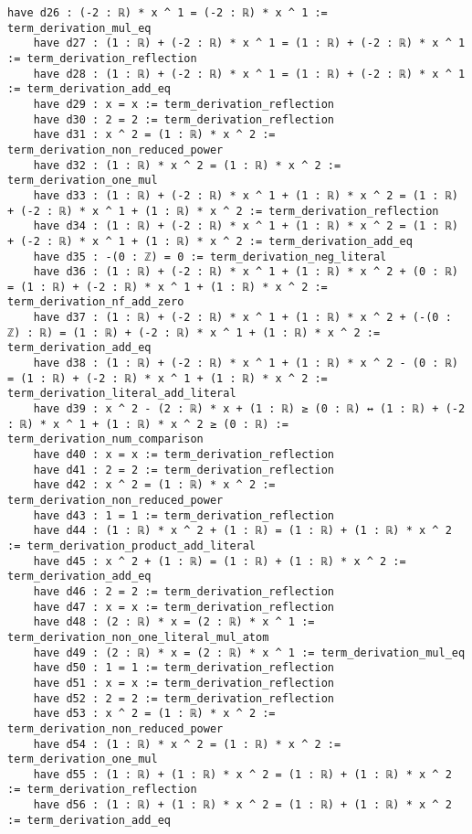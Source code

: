 \documentclass{article}
\begin{document}
\begin{tcolorbox}[colback=white!10, width=\linewidth]
\begin{lstlisting}[language=Lean4]
    have d26 : (-2 : ℝ) * x ^ 1 = (-2 : ℝ) * x ^ 1 := term_derivation_mul_eq
    have d27 : (1 : ℝ) + (-2 : ℝ) * x ^ 1 = (1 : ℝ) + (-2 : ℝ) * x ^ 1 := term_derivation_reflection
    have d28 : (1 : ℝ) + (-2 : ℝ) * x ^ 1 = (1 : ℝ) + (-2 : ℝ) * x ^ 1 := term_derivation_add_eq
    have d29 : x = x := term_derivation_reflection
    have d30 : 2 = 2 := term_derivation_reflection
    have d31 : x ^ 2 = (1 : ℝ) * x ^ 2 := term_derivation_non_reduced_power
    have d32 : (1 : ℝ) * x ^ 2 = (1 : ℝ) * x ^ 2 := term_derivation_one_mul
    have d33 : (1 : ℝ) + (-2 : ℝ) * x ^ 1 + (1 : ℝ) * x ^ 2 = (1 : ℝ) + (-2 : ℝ) * x ^ 1 + (1 : ℝ) * x ^ 2 := term_derivation_reflection
    have d34 : (1 : ℝ) + (-2 : ℝ) * x ^ 1 + (1 : ℝ) * x ^ 2 = (1 : ℝ) + (-2 : ℝ) * x ^ 1 + (1 : ℝ) * x ^ 2 := term_derivation_add_eq
    have d35 : -(0 : ℤ) = 0 := term_derivation_neg_literal
    have d36 : (1 : ℝ) + (-2 : ℝ) * x ^ 1 + (1 : ℝ) * x ^ 2 + (0 : ℝ) = (1 : ℝ) + (-2 : ℝ) * x ^ 1 + (1 : ℝ) * x ^ 2 := term_derivation_nf_add_zero
    have d37 : (1 : ℝ) + (-2 : ℝ) * x ^ 1 + (1 : ℝ) * x ^ 2 + (-(0 : ℤ) : ℝ) = (1 : ℝ) + (-2 : ℝ) * x ^ 1 + (1 : ℝ) * x ^ 2 := term_derivation_add_eq
    have d38 : (1 : ℝ) + (-2 : ℝ) * x ^ 1 + (1 : ℝ) * x ^ 2 - (0 : ℝ) = (1 : ℝ) + (-2 : ℝ) * x ^ 1 + (1 : ℝ) * x ^ 2 := term_derivation_literal_add_literal
    have d39 : x ^ 2 - (2 : ℝ) * x + (1 : ℝ) ≥ (0 : ℝ) ↔ (1 : ℝ) + (-2 : ℝ) * x ^ 1 + (1 : ℝ) * x ^ 2 ≥ (0 : ℝ) := term_derivation_num_comparison
    have d40 : x = x := term_derivation_reflection
    have d41 : 2 = 2 := term_derivation_reflection
    have d42 : x ^ 2 = (1 : ℝ) * x ^ 2 := term_derivation_non_reduced_power
    have d43 : 1 = 1 := term_derivation_reflection
    have d44 : (1 : ℝ) * x ^ 2 + (1 : ℝ) = (1 : ℝ) + (1 : ℝ) * x ^ 2 := term_derivation_product_add_literal
    have d45 : x ^ 2 + (1 : ℝ) = (1 : ℝ) + (1 : ℝ) * x ^ 2 := term_derivation_add_eq
    have d46 : 2 = 2 := term_derivation_reflection
    have d47 : x = x := term_derivation_reflection
    have d48 : (2 : ℝ) * x = (2 : ℝ) * x ^ 1 := term_derivation_non_one_literal_mul_atom
    have d49 : (2 : ℝ) * x = (2 : ℝ) * x ^ 1 := term_derivation_mul_eq
    have d50 : 1 = 1 := term_derivation_reflection
    have d51 : x = x := term_derivation_reflection
    have d52 : 2 = 2 := term_derivation_reflection
    have d53 : x ^ 2 = (1 : ℝ) * x ^ 2 := term_derivation_non_reduced_power
    have d54 : (1 : ℝ) * x ^ 2 = (1 : ℝ) * x ^ 2 := term_derivation_one_mul
    have d55 : (1 : ℝ) + (1 : ℝ) * x ^ 2 = (1 : ℝ) + (1 : ℝ) * x ^ 2 := term_derivation_reflection
    have d56 : (1 : ℝ) + (1 : ℝ) * x ^ 2 = (1 : ℝ) + (1 : ℝ) * x ^ 2 := term_derivation_add_eq

\end{lstlisting}
\end{tcolorbox}
\end{document}
